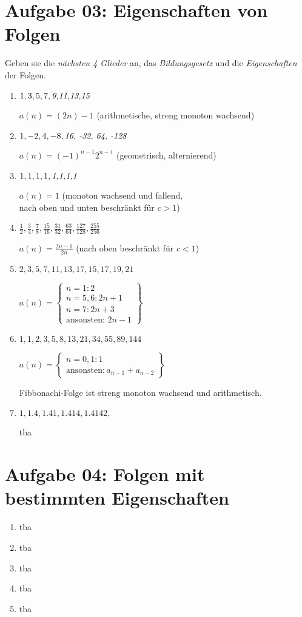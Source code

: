 \documentclass[a4paper,11pt]{article}
\begin{document}
\section{Aufgabe 03: Eigenschaften von Folgen}
Geben sie die \emph{nächsten 4 Glieder} an, das \emph{Bildungsgesetz} und die \emph{Eigenschaften} der Folgen.
\begin{enumerate}[label={\alph*)}]
	\item $1,3,5,7,\emph{9,11,13,15}$

		$a(n)=(2n)-1$ (arithmetische, streng monoton wachsend)
	\item $1,-2,4,-8,\emph{16, -32, 64, -128}$

		$a(n)=(-1)^{n-1}2^{n-1}$ (geometrisch, alternierend)
	\item $1,1,1,1,\emph{1,1,1,1}$

		$a(n)=1$ (monoton wachsend und fallend,\\
		nach oben und unten beschränkt für $c>1$)
	\item $\frac{1}{2},\frac{3}{4},\frac{7}{8},\frac{15}{16},\frac{31}{32},\frac{63}{64},\frac{127}{128},\frac{255}{256}$

		$a(n)=\frac{2n-1}{2n}$ (nach oben beschränkt für $c<1$)
	\item $2,3,5,7,11,13,17,15,17,19,21$

		$a(n)=\begin{Bmatrix}n=1:2\\
			n=5,6: 2n+1\\
			n=7: 2n+3\\
			\text{ansonsten: } 2n-1
		      \end{Bmatrix}$
	\item $1,1,2,3,5,8,13,21,34,55,89,144$

		$a(n)=\begin{Bmatrix}n=0,1: 1\\
			\text{ansonsten}: a_{n-1}+a_{n-2}
		\end{Bmatrix}$

		Fibbonachi-Folge ist streng monoton wachsend und arithmetisch.
	\item $1,1.4,1.41,1.414,1.4142,$

		tba
\end{enumerate}
\section{Aufgabe 04: Folgen mit bestimmten Eigenschaften}
\begin{enumerate}[label={\alph*)}]
	\item tba
	\item tba
	\item tba
	\item tba
	\item tba
\end{enumerate}
\end{document}
